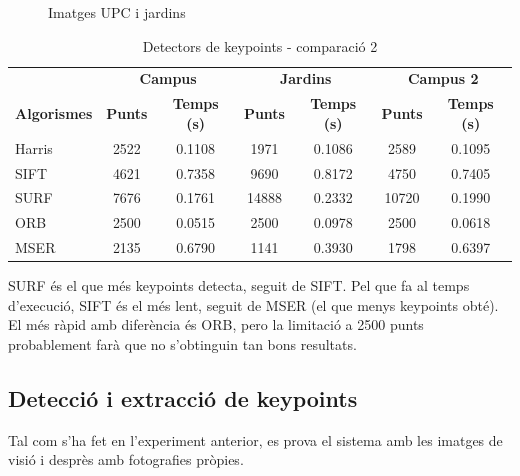 \begin{figure}[!htb]
				\label{fig:awesome_image3}
			\endminipage
			\caption{Imatges UPC i jardins}
		\end{figure}

		\begin{table}[H]
			\begin{center}
				\begin{tabular}{l | c c | c c | c c}
					& \multicolumn{2}{c|}{\textbf{Campus}} & \multicolumn{2}{c|}{\textbf{Jardins}} & \multicolumn{2}{c}{\textbf{Campus 2}} \\
					\textbf{Algorismes} & \textbf{Punts} & \textbf{Temps (s)} & \textbf{Punts} & \textbf{Temps (s)} & \textbf{Punts} & \textbf{Temps (s)} \\ \hline
					Harris & 2522 & 0.1108 & 1971 & 0.1086 & 2589 & 0.1095 \\
					SIFT & 4621 & 0.7358 & 9690 & 0.8172 & 4750 & 0.7405 \\
					SURF & 7676 & 0.1761 & 14888 & 0.2332 & 10720 & 0.1990 \\
					ORB & 2500 & 0.0515 & 2500 & 0.0978 & 2500 & 0.0618 \\
					MSER & 2135 & 0.6790 & 1141 & 0.3930 & 1798 & 0.6397 \\
				\end{tabular}
			\end{center}
			\caption{Detectors de keypoints - comparació 2}
		\end{table}
		\noindent
		SURF és el que més keypoints detecta, seguit de SIFT. Pel que fa al temps d'execució, SIFT és el més lent, seguit de MSER (el que menys keypoints obté). El més ràpid amb diferència és ORB, pero la
		limitació a 2500 punts probablement farà que no s'obtinguin tan bons resultats.
\newpage
	\subsection{Detecció i extracció de keypoints}
		Tal com s'ha fet en l'experiment anterior, es prova el sistema amb les imatges de visió i desprès amb fotografies pròpies.

